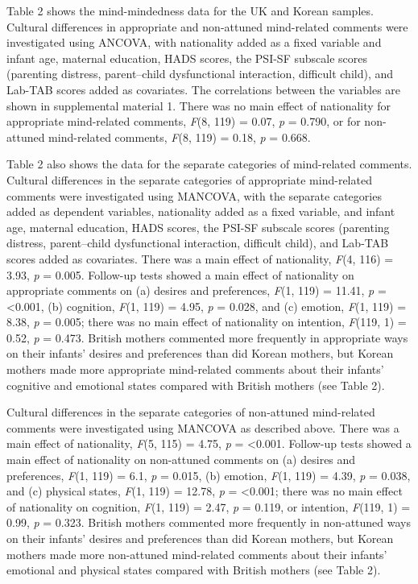 \documentclass[
]{article}
\begin{document}
Table 2 shows the mind-mindedness data for the UK and Korean samples. Cultural differences in appropriate and non-attuned mind-related comments were investigated using ANCOVA, with nationality added as a fixed variable and infant age, maternal education, HADS scores, the PSI-SF subscale scores (parenting distress, parent--child dysfunctional interaction, difficult child), and Lab-TAB scores added as covariates. The correlations between the variables are shown in supplemental material 1.
There was no main effect of nationality for appropriate mind-related comments, \emph{F}(8, 119) = 0.07, \emph{p} = 0.790,
or for non-attuned mind-related comments, \emph{F}(8, 119) = 0.18, \emph{p} = 0.668.

Table 2 also shows the data for the separate categories of mind-related comments. Cultural differences in the separate categories of appropriate mind-related comments were investigated using MANCOVA, with the separate categories added as dependent variables, nationality added as a fixed variable, and infant age, maternal education, HADS scores, the PSI-SF subscale scores (parenting distress, parent--child dysfunctional interaction, difficult child), and Lab-TAB scores added as covariates.
There was a main effect of nationality, \emph{F}(4, 116) = 3.93, \emph{p} = 0.005.
Follow-up tests showed a main effect of nationality on appropriate comments on (a) desires and preferences, \emph{F}(1, 119) = 11.41, \emph{p} = \textless0.001,
(b) cognition, \emph{F}(1, 119) = 4.95, \emph{p} = 0.028,
and (c) emotion, \emph{F}(1, 119) = 8.38, \emph{p} = 0.005;
there was no main effect of nationality on intention, \emph{F}(119, 1) = 0.52, \emph{p} = 0.473.
British mothers commented more frequently in appropriate ways on their infants' desires and preferences than did Korean mothers, but Korean mothers made more appropriate mind-related comments about their infants' cognitive and emotional states compared with British mothers (see Table 2).

Cultural differences in the separate categories of non-attuned mind-related comments were investigated using MANCOVA as described above.
There was a main effect of nationality, \emph{F}(5, 115) = 4.75, \emph{p} = \textless0.001.
Follow-up tests showed a main effect of nationality on non-attuned comments on (a)
desires and preferences, \emph{F}(1, 119) = 6.1, \emph{p} = 0.015, (b)
emotion, \emph{F}(1, 119) = 4.39, \emph{p} = 0.038, and (c)
physical states, \emph{F}(1, 119) = 12.78, \emph{p} = \textless0.001;
there was no main effect of nationality on cognition, \emph{F}(1, 119) = 2.47, \emph{p} = 0.119,
or intention, \emph{F}(119, 1) = 0.99, \emph{p} = 0.323.
British mothers commented more frequently in non-attuned ways on their infants' desires and preferences than did Korean mothers, but Korean mothers made more non-attuned mind-related comments about their infants' emotional and physical states compared with British mothers (see Table 2).
\end{document}
